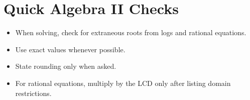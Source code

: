 \documentclass[11pt]{article}
\begin{document}
\section*{Quick Algebra II Checks}
\begin{itemize}
  \item When solving, check for extraneous roots from logs and rational equations.
  \item Use exact values whenever possible.
  \item State rounding only when asked.
  \item For rational equations, multiply by the LCD only after listing domain restrictions.
\end{itemize}
\end{document}
